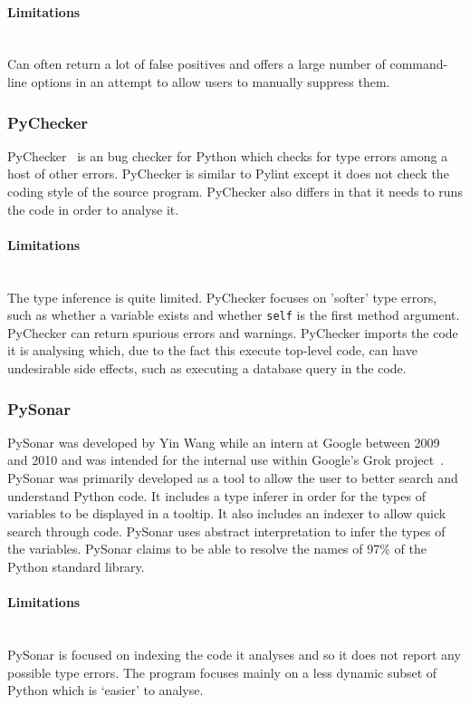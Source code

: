 \documentclass[12pt, titlepage]{article}
\begin{document}
\paragraph{Limitations}\mbox{}\\
Can often return a lot of false positives and offers a large number of command-line options in an attempt to allow users to manually suppress them.

\subsubsection{PyChecker}
PyChecker~\cite{pychecker} is an bug checker for Python which checks for type errors among a host of other errors. PyChecker is similar to Pylint except it does not check the coding style of the source program. PyChecker also differs in that it needs to runs the code in order to analyse it.
\paragraph{Limitations}\mbox{}\\
The type inference is quite limited. PyChecker focuses on 'softer' type errors, such as whether a variable exists and whether \texttt{self} is the first method argument. \\
\indent PyChecker can return spurious errors and warnings. PyChecker imports the code it is analysing which, due to the fact this execute top-level code, can have undesirable side effects, such as executing a database query in the code.

\subsubsection{PySonar}
PySonar was developed by Yin Wang while an intern at Google between 2009 and 2010 and was intended for the internal use within Google's Grok project~\cite{pySonar}. PySonar was primarily developed as a tool to allow the user to better search and understand Python code. It includes a type inferer in order for the types of variables to be displayed in a tooltip. It also includes an indexer to allow quick search through code. PySonar uses abstract interpretation to infer the types of the variables. PySonar claims to be able to resolve the names of 97\% of the Python standard library.
\paragraph{Limitations}\mbox{}\\
PySonar is focused on indexing the code it analyses and so it does not report any possible type errors. The program focuses mainly on a less dynamic subset of Python which is `easier' to analyse.
\end{document}
